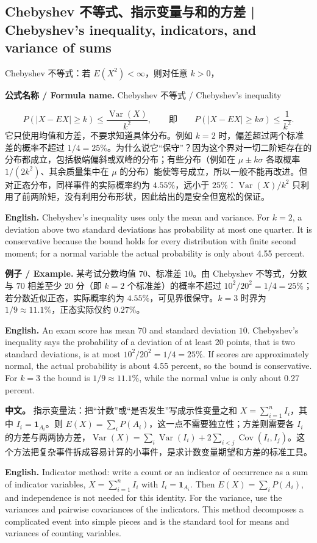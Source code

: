 \documentclass[UTF8,11pt,a4paper]{ctexart}
\newcommand{\EN}[1]{\par\noindent\textbf{English.} #1\par}
\newcommand{\FORMULA}[2]{\par\noindent\textbf{公式名称 / Formula name.} #1 / #2\par}
\newcommand{\EX}[2]{\par\noindent\textbf{例子 / Example.} #1\par\EN{#2}}
\newcommand{\APS}[2]{\par\noindent\textbf{中文。} #1\par\noindent\textbf{English.} #2\par\smallskip}
\begin{document}
\subsection{Chebyshev 不等式、指示变量与和的方差 | Chebyshev's inequality, indicators, and variance of sums}
\noindent Chebyshev 不等式：若 $E(X^2)<\infty$，则对任意 $k>0$，
\FORMULA{Chebyshev 不等式}{Chebyshev's inequality}
\[
P(|X-EX|\ge k)\le\frac{\operatorname{Var}(X)}{k^2},
\qquad\text{即}\qquad P(|X-EX|\ge k\sigma)\le\frac1{k^2}.
\]
它只使用均值和方差，不要求知道具体分布。例如 $k=2$ 时，偏差超过两个标准差的概率不超过 $1/4=25\%$。为什么说它“保守”？因为这个界对一切二阶矩存在的分布都成立，包括极端偏斜或双峰的分布；有些分布（例如在 $\mu\pm k\sigma$ 各取概率 $1/(2k^2)$、其余质量集中在 $\mu$ 的分布）能使等号成立，所以一般不能再改进。但对正态分布，同样事件的实际概率约为 $4.55\%$，远小于 $25\%$：$\operatorname{Var}(X)/k^2$ 只利用了前两阶矩，没有利用分布形状，因此给出的是安全但宽松的保证。
\EN{Chebyshev's inequality uses only the mean and variance. For $k=2$, a deviation above two standard deviations has probability at most one quarter. It is conservative because the bound holds for every distribution with finite second moment; for a normal variable the actual probability is only about 4.55 percent.}

\EX{某考试分数均值 $70$、标准差 $10$。由 Chebyshev 不等式，分数与 $70$ 相差至少 $20$ 分（即 $k=2$ 个标准差）的概率不超过 $10^2/20^2=1/4=25\%$；若分数近似正态，实际概率约为 $4.55\%$，可见界很保守。$k=3$ 时界为 $1/9\approx11.1\%$，正态实际仅约 $0.27\%$。}{An exam score has mean $70$ and standard deviation $10$. Chebyshev's inequality says the probability of a deviation of at least 20 points, that is two standard deviations, is at most $10^2/20^2=1/4=25\%$. If scores are approximately normal, the actual probability is about 4.55 percent, so the bound is conservative. For $k=3$ the bound is $1/9\approx11.1\%$, while the normal value is only about 0.27 percent.}

\APS{指示变量法：把“计数”或“是否发生”写成示性变量之和 $X=\sum_{i=1}^n I_i$，其中 $I_i=\mathbf1_{A_i}$。则 $E(X)=\sum_iP(A_i)$，这一点不需要独立性；方差则需要各 $I_i$ 的方差与两两协方差，$\operatorname{Var}(X)=\sum_i\operatorname{Var}(I_i)+2\sum_{i<j}\operatorname{Cov}(I_i,I_j)$。这个方法把复杂事件拆成容易计算的小事件，是求计数变量期望和方差的标准工具。}{Indicator method: write a count or an indicator of occurrence as a sum of indicator variables, $X=\sum_{i=1}^n I_i$ with $I_i=\mathbf1_{A_i}$. Then $E(X)=\sum_iP(A_i)$, and independence is not needed for this identity. For the variance, use the variances and pairwise covariances of the indicators. This method decomposes a complicated event into simple pieces and is the standard tool for means and variances of counting variables.}
\end{document}
